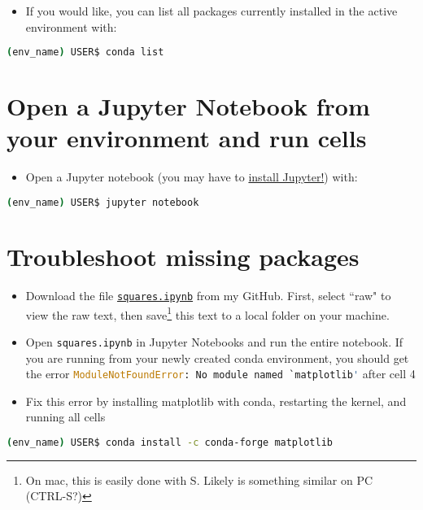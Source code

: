 \documentclass[10pt]{article}
\begin{document}
\begin{itemize}
	\item If you would like, you can list all packages currently installed in the active environment with:
\end{itemize}
\begin{lstlisting}[language=bash]
	(env_name) USER$ conda list
\end{lstlisting}

	
\section{Open a Jupyter Notebook from your environment and run cells}
\begin{itemize}
	\item Open a Jupyter notebook (you may have to \href{https://anaconda.org/anaconda/jupyter}{install Jupyter!}) with:
\end{itemize}

\begin{lstlisting}[language=bash]
	(env_name) USER$ jupyter notebook
\end{lstlisting}

\section{Troubleshoot missing packages}
\begin{itemize}
	\item Download the file \href{https://github.com/m-needham/first_year_programming_sequence/blob/main/1_conda_jupyter/squares.ipynb}{ \lstinline|squares.ipynb|} from my GitHub. First, select ``raw" to view the raw text, then save\footnote{On mac, this is easily done with \cmd S. Likely is something similar on PC (CTRL-S?)} this text to a local folder on your machine.
	
	\item Open \lstinline|squares.ipynb| in Jupyter Notebooks and run the entire notebook. If you are running from your newly created conda environment, you should get the error  \lstinline[language=Python]|ModuleNotFoundError: No module named `matplotlib'|  after cell 4
	
	\item Fix this error by installing matplotlib with conda, restarting the kernel, and running all cells 
	
\end{itemize}

\begin{lstlisting}[language=bash]
	(env_name) USER$ conda install -c conda-forge matplotlib
\end{lstlisting}
\end{document}
